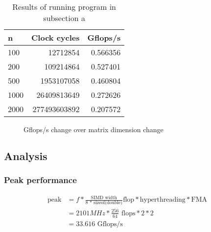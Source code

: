 \documentclass[12pt]{article}
\begin{document}
\begin{table}[H]
  \centering
  \begin{tabular}{lrr}
    \toprule
    \multicolumn{1}{l}{n}            &
    \multicolumn{1}{l}{Clock cycles} &
    \multicolumn{1}{l}{Gflops/s}                               \\
    \midrule
    100                              & 12712854     & 0.566356 \\
    200                              & 109214864    & 0.527401 \\
    500                              & 1953107058   & 0.460804 \\
    1000                             & 26409813649  & 0.272626 \\
    2000                             & 277493603892 & 0.207572 \\
    \bottomrule
  \end{tabular}
  \caption{Results of running program in subsection a}
\end{table}

\begin{figure}[t]
  \centering
  \caption{Gflops/s change over matrix dimension change}
\end{figure}

\subsection{Analysis}
\subsubsection{Peak performance}
\begin{equation}
  \begin{aligned}
    \text{peak} & = f * \frac{\text{SIMD width}}{\text{8 * sizeof(double)}}\text{flop} * \text{hyperthreading} * \text{FMA} \\
                & = 2101 \si{MHz} * \frac{256}{64}\text{ flops} * 2 * 2                                                     \\
                & = 33.616 \text{ Gflops/s}
  \end{aligned}
\end{equation}
\end{document}
